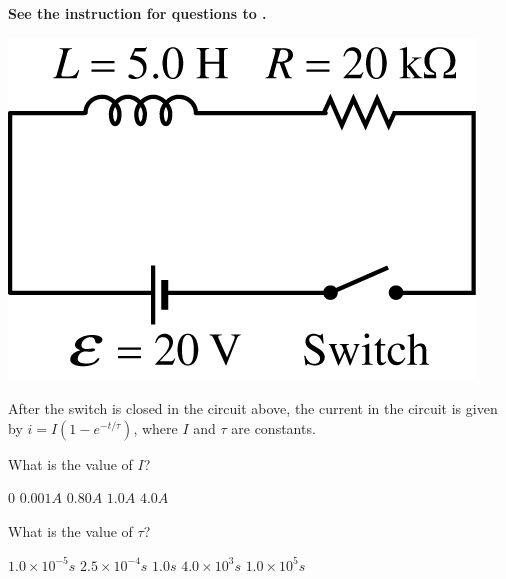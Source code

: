 
\textbf{See the instruction for questions  to .} 

\begin{center}
    \includegraphics[scale=0.3]{images/img-012-020.png}
\end{center}

After the switch is closed in the circuit above, the current in the circuit is given by $i=I\left(1-e^{-t / \tau}\right)$, where $I$ and $\tau$ are constants.

\begin{questions}\setcounter{question}{21}\question
What is the value of $I$?

\begin{oneparchoices}
    \choice $0$
    \choice $0.001 \unit{A}$
    \choice $0.80 \unit{A}$
    \choice $1.0 \unit{A}$
    \choice $4.0 \unit{A}$
\end{oneparchoices}
\end{questions}

\begin{questions}\setcounter{question}{22}\question
What is the value of $\tau$?

\begin{oneparchoices}
    \choice $1.0 \times 10^{-5} \unit{s}$
    \choice $2.5 \times 10^{-4} \unit{s}$
    \choice $1.0 \unit{s}$
    \choice $4.0 \times 10^{3} \unit{s}$
    \choice $1.0 \times 10^{5} \unit{s}$
\end{oneparchoices}
\end{questions}
